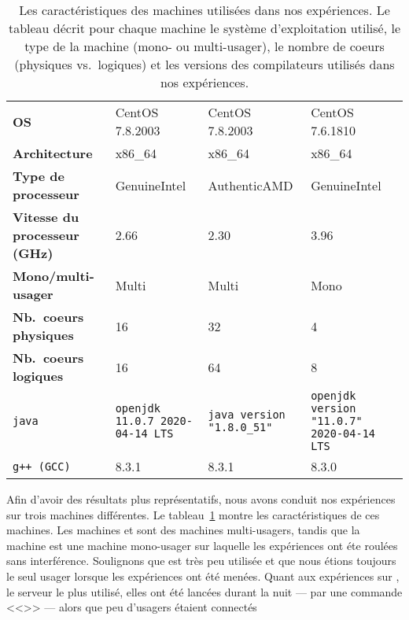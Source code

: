\newcommand{\LARGEUR}{3cm}

\begin{table}
\begin{tabular}{|p{3cm}|p{\LARGEUR}|p{\LARGEUR}|p{\LARGEUR}|}
\hline
  & \M1 & \M2 & \M3
\\\hline
\textbf{OS} & CentOS 7.8.2003 & CentOS 7.8.2003 & CentOS 7.6.1810
\\\hline
\textbf{Architecture} &  x86\_64 & x86\_64 & x86\_64
\\\hline
\textbf{Type de processeur} & GenuineIntel  & AuthenticAMD & GenuineIntel
\\\hline
\textbf{Vitesse du processeur (GHz)} & 2.66 & 2.30 & 3.96
\\\hline
\textbf{Mono/multi-usager} & Multi & Multi & Mono
\\\hline
\textbf{Nb.~coeurs physiques} & 16 & 32 & 4
\\\hline
\textbf{Nb.~coeurs logiques} & 16 & 64 & 8
\\\hline
\texttt{java}
  & \texttt{openjdk 11.0.7 2020-04-14 LTS}
  & \texttt{java version "1.8.0\_51"}
  & \texttt{openjdk version "11.0.7" 2020-04-14 LTS}
\\\hline
\texttt{g++ (GCC)}
   & 8.3.1
   & 8.3.1 
   & 8.3.0
\\\hline
\end{tabular}
\caption[Les caract\'eristiques des machines utilis\'ees dans nos exp\'eriences.]{Les caract\'eristiques des machines utilis\'ees dans nos exp\'eriences. Le tableau d\'ecrit pour chaque machine le syst\`eme d'exploitation utilis\'e, le type de la machine (mono- ou multi-usager), le nombre de coeurs (physiques vs.\ logiques) et les versions des compilateurs utilis\'es dans nos exp\'eriences.}
\label{machines.table}
\end{table}


Afin d'avoir des r\'esultats plus représentatifs, nous avons conduit nos exp\'eriences sur trois machines diff\'erentes. Le tableau~\ref{machines.table} montre les caract\'eristiques de ces machines. Les machines  et  sont des machines multi-usagers, tandis que la machine  est une machine mono-usager sur laquelle les exp\'eriences ont \'et\/e roul\'ees sans interf\'erence.
%
Soulignons que  est très peu utilisée et que nous étions toujours
le seul usager lorsque les expériences ont été menées. Quant aux
expériences sur , le serveur  le plus utilisé, elles
ont été lancées durant la nuit --- par une commande <<>> --- alors que peu d'usagers étaient connectés

